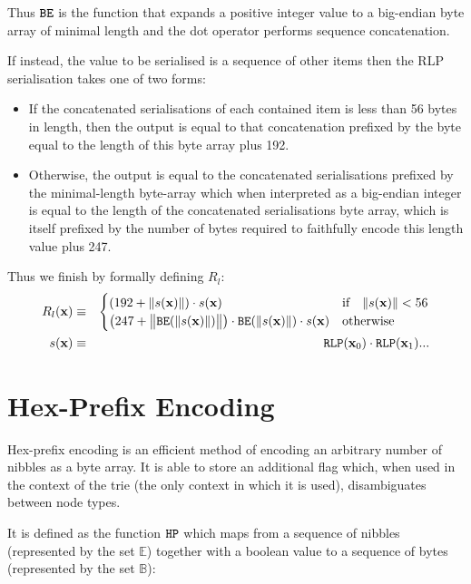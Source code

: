 \documentclass[9pt,oneside]{amsart}
\begin{document}
Thus $\mathtt{\tiny BE}$ is the function that expands a positive integer value to a big-endian byte array of minimal length and the dot operator performs sequence concatenation.

If instead, the value to be serialised is a sequence of other items then the RLP serialisation takes one of two forms:

\begin{itemize}
\item If the concatenated serialisations of each contained item is less than 56 bytes in length, then the output is equal to that concatenation prefixed by the byte equal to the length of this byte array plus 192.
\item Otherwise, the output is equal to the concatenated serialisations prefixed by the minimal-length byte-array which when interpreted as a big-endian integer is equal to the length of the concatenated serialisations byte array, which is itself prefixed by the number of bytes required to faithfully encode this length value plus 247.
\end{itemize}

Thus we finish by formally defining $R_l$:
\begin{eqnarray}
R_l(\mathbf{x}) & \equiv & \begin{cases}
(192 + \lVert s(\mathbf{x}) \rVert) \cdot s(\mathbf{x}) & \text{if} \quad \lVert s(\mathbf{x}) \rVert < 56 \\
\big(247 + \big\lVert \mathtt{\tiny BE}(\lVert s(\mathbf{x}) \rVert) \big\rVert \big) \cdot \mathtt{\tiny BE}(\lVert s(\mathbf{x}) \rVert) \cdot s(\mathbf{x}) & \text{otherwise}
\end{cases} \\
s(\mathbf{x}) & \equiv & \mathtt{\tiny RLP}(\mathbf{x}_0) \cdot \mathtt{\tiny RLP}(\mathbf{x}_1) ...
\end{eqnarray}

\section{Hex-Prefix Encoding}\label{app:hexprefix}
Hex-prefix encoding is an efficient method of encoding an arbitrary number of nibbles as a byte array. It is able to store an additional flag which, when used in the context of the trie (the only context in which it is used), disambiguates between node types.

It is defined as the function $\mathtt{\tiny HP}$ which maps from a sequence of nibbles (represented by the set $\mathbb{E}$) together with a boolean value to a sequence of bytes (represented by the set $\mathbb{B}$):
\end{document}
